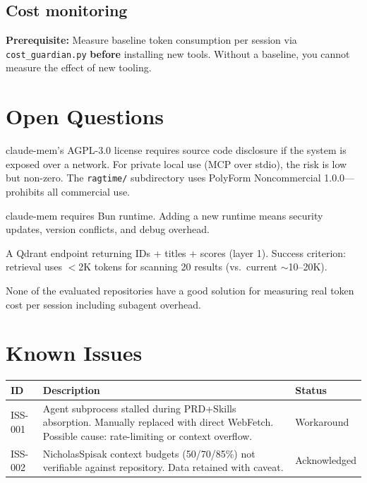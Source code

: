 \documentclass[11pt,a4paper]{article}
\begin{document}
\subsection{Cost monitoring}

\textbf{Prerequisite:} Measure baseline token consumption per session via \texttt{cost\_guardian.py} \textbf{before} installing new tools. Without a baseline, you cannot measure the effect of new tooling.

\newpage

\section{Open Questions}

\begin{description}[style=nextline]
  \item[1. AGPL \S 13 evaluation]
  claude-mem's AGPL-3.0 license requires source code disclosure if the system is exposed over a network. For private local use (MCP over stdio), the risk is low but non-zero. The \texttt{ragtime/} subdirectory uses PolyForm Noncommercial 1.0.0---prohibits all commercial use.

  \item[2. Bun dependency]
  claude-mem requires Bun runtime. Adding a new runtime means security updates, version conflicts, and debug overhead.

  \item[3. Progressive disclosure MVP]
  A Qdrant endpoint returning IDs + titles + scores (layer 1). Success criterion: retrieval uses $<$2K tokens for scanning 20 results (vs.\ current $\sim$10--20K).

  \item[4. Token cost monitoring for subagents]
  None of the evaluated repositories have a good solution for measuring real token cost per session including subagent overhead.
\end{description}

\section{Known Issues}

\begin{tabularx}{\textwidth}{l X l}
\toprule
\textbf{ID} & \textbf{Description} & \textbf{Status} \\
\midrule
ISS-001 & Agent subprocess stalled during PRD+Skills absorption. Manually replaced with direct WebFetch. Possible cause: rate-limiting or context overflow. & Workaround \\
\midrule
ISS-002 & NicholasSpisak context budgets (50/70/85\%) not verifiable against repository. Data retained with caveat. & Acknowledged \\
\bottomrule
\end{tabularx}
\end{document}
